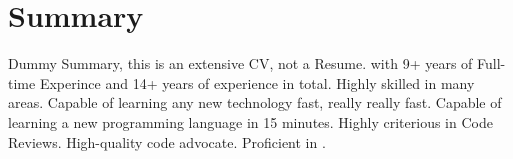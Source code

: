 \section{Summary}
\small{Dummy Summary, this is an extensive CV, not a Resume.}
\small{\POSITION{} with 9+ years of Full-time Experince and 14+ years of experience in total. Highly skilled in
    many areas. Capable of learning any new technology fast, really really fast. Capable of learning a new
    programming language in 15 minutes. Highly criterious in Code Reviews. High-quality code advocate.
    Proficient in \LanguagesOrder.}